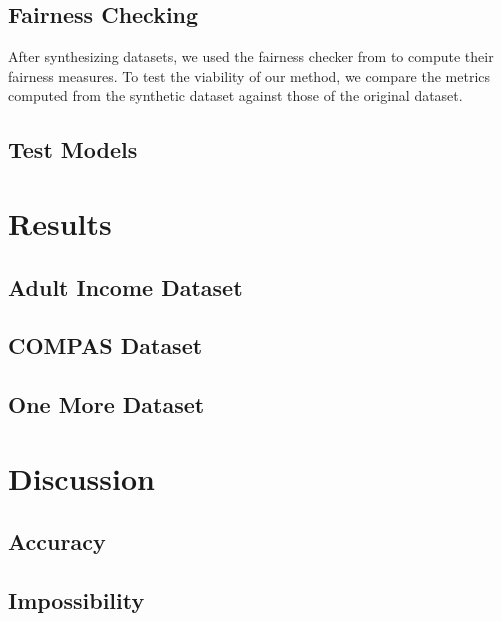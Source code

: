 \documentclass[acmsmall,sigconf]{acmart}
\begin{document}
\subsection{Fairness Checking}

After synthesizing datasets, we used the fairness checker from \cite{yuan2024ensuring} to compute their fairness measures. To test the viability of our method, we compare the metrics computed from the synthetic dataset against those of the original dataset.

\subsection{Test Models}


\section{Results}

\subsection{Adult Income Dataset}

\subsection{COMPAS Dataset}

\subsection{One More Dataset}

\section{Discussion}

\subsection{Accuracy}

\subsection{Impossibility}
\end{document}
